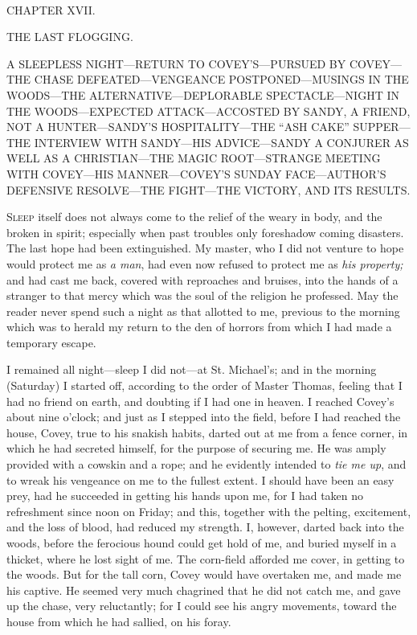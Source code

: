 {}

~

{CHAPTER XVII.}

THE LAST FLOGGING.

{A SLEEPLESS NIGHT---RETURN TO COVEY'S---PURSUED BY COVEY---THE CHASE
DEFEATED---VENGEANCE POSTPONED---MUSINGS IN THE WOODS---THE
ALTERNATIVE---DEPLORABLE SPECTACLE---NIGHT IN THE WOODS---EXPECTED
ATTACK---ACCOSTED BY SANDY, A FRIEND, NOT A HUNTER---SANDY'S
HOSPITALITY---THE ``ASH CAKE'' SUPPER---THE INTERVIEW WITH SANDY---HIS
ADVICE---SANDY A CONJURER AS WELL AS A CHRISTIAN---THE MAGIC
ROOT---STRANGE MEETING WITH COVEY---HIS MANNER---COVEY'S SUNDAY
FACE---AUTHOR'S DEFENSIVE RESOLVE---THE FIGHT---THE VICTORY, AND ITS
RESULTS.}

\textsc{Sleep} itself does not always come to the relief of the weary in
body, and the broken in spirit; especially when past troubles only
foreshadow coming disasters. The last hope had been extinguished. My
master, who I did not venture to hope would protect me as \emph{a man},
had even now refused to protect me as \emph{his property;} and had cast
me back, covered with reproaches and bruises, into the hands of a
stranger to that mercy which was the soul of the religion he professed.
May the reader never spend such a night as that allotted to me, previous
to the morning which was to herald my return to the den of horrors from
which I had made a temporary escape.

I remained all night---sleep I did not---at St. Michael's; and in the
morning (Saturday) I started off, according to the order of Master
Thomas, feeling that {}I had no friend on earth, and doubting if I had
one in heaven. I reached Covey's about nine o'clock; and just as I
stepped into the field, before I had reached the house, Covey, true to
his snakish habits, darted out at me from a fence corner, in which he
had secreted himself, for the purpose of securing me. He was amply
provided with a cowskin and a rope; and he evidently intended to
\emph{tie me up}, and to wreak his vengeance on me to the fullest
extent. I should have been an easy prey, had he succeeded in getting his
hands upon me, for I had taken no refreshment since noon on Friday; and
this, together with the pelting, excitement, and the loss of blood, had
reduced my strength. I, however, darted back into the woods, before the
ferocious hound could get hold of me, and buried myself in a thicket,
where he lost sight of me. The corn-field afforded me cover, in getting
to the woods. But for the tall corn, Covey would have overtaken me, and
made me his captive. He seemed very much chagrined that he did not catch
me, and gave up the chase, very reluctantly; for I could see his angry
movements, toward the house from which he had sallied, on his foray.

